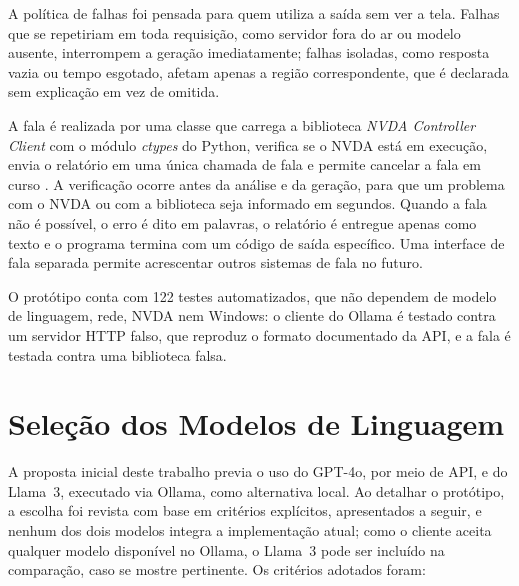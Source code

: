 \documentclass[
    12pt,                   %
    openright,              %
    oneside,                %
    a4paper,                %
    sumario=tradicional,    %
    english,                %
    brazil,                 %
    ]{abntex2}
\begin{document}
A política de falhas foi pensada para quem utiliza a saída sem ver a tela. Falhas que se repetiriam em toda requisição, como servidor fora do ar ou modelo ausente, interrompem a geração imediatamente; falhas isoladas, como resposta vazia ou tempo esgotado, afetam apenas a região correspondente, que é declarada sem explicação em vez de omitida.

A fala é realizada por uma classe que carrega a biblioteca \textit{NVDA Controller Client} com o módulo \textit{ctypes} do Python, verifica se o NVDA está em execução, envia o relatório em uma única chamada de fala e permite cancelar a fala em curso \cite{nvaccess2024controller}. A verificação ocorre antes da análise e da geração, para que um problema com o NVDA ou com a biblioteca seja informado em segundos. Quando a fala não é possível, o erro é dito em palavras, o relatório é entregue apenas como texto e o programa termina com um código de saída específico. Uma interface de fala separada permite acrescentar outros sistemas de fala no futuro.

O protótipo conta com 122 testes automatizados, que não dependem de modelo de linguagem, rede, NVDA nem Windows: o cliente do Ollama é testado contra um servidor HTTP falso, que reproduz o formato documentado da API, e a fala é testada contra uma biblioteca falsa.

\section{Seleção dos Modelos de Linguagem}\label{sec:modelos}

A proposta inicial deste trabalho previa o uso do GPT-4o, por meio de API, e do Llama~3, executado via Ollama, como alternativa local. Ao detalhar o protótipo, a escolha foi revista com base em critérios explícitos, apresentados a seguir, e nenhum dos dois modelos integra a implementação atual; como o cliente aceita qualquer modelo disponível no Ollama, o Llama~3 pode ser incluído na comparação, caso se mostre pertinente. Os critérios adotados foram:
\end{document}
